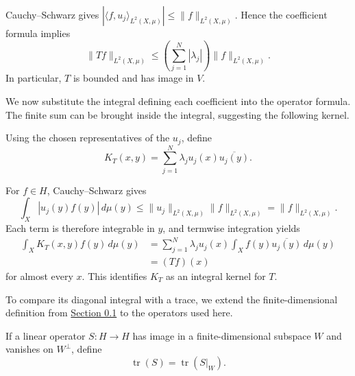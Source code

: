 Cauchy--Schwarz gives $|\langle f,u_j\rangle_{L^2(X,\mu)}|\leq\|f\|_{L^2(X,\mu)}$. Hence the coefficient formula implies
\[
\|Tf\|_{L^2(X,\mu)}
\leq\left(\sum_{j=1}^N|\lambda_j|\right)\|f\|_{L^2(X,\mu)}.
\]
In particular, $T$ is bounded and has image in $V$.

We now substitute the integral defining each coefficient into the operator formula. The finite sum can be brought inside the integral, suggesting the following kernel.

\begin{definition}\label{finite-spectral-kernel}
Using the chosen representatives of the $u_j$, define
\[
K_T(x,y)=\sum_{j=1}^N\lambda_j u_j(x)\overline{u_j(y)}.
\]
\end{definition}

For $f\in H$, Cauchy--Schwarz gives
\[
\int_X|u_j(y)f(y)|\,d\mu(y)
\leq\|u_j\|_{L^2(X,\mu)}\|f\|_{L^2(X,\mu)}
=\|f\|_{L^2(X,\mu)}.
\]
Each term is therefore integrable in $y$, and termwise integration yields
\[
\begin{aligned}
\int_XK_T(x,y)f(y)\,d\mu(y)
&=\sum_{j=1}^N\lambda_j u_j(x)
 \int_X f(y)\overline{u_j(y)}\,d\mu(y)\\
&=(Tf)(x)
\end{aligned}
\]
for almost every $x$. This identifies $K_T$ as an integral kernel for $T$.

To compare its diagonal integral with a trace, we extend the finite-dimensional definition from \hyperref[v1a-ch00-s1]{Section 0.1} to the operators used here.

\begin{definition}\label{finite-kernel-trace-definition}
If a linear operator $S:H\to H$ has image in a finite-dimensional subspace $W$ and vanishes on $W^\perp$, define
\[
\operatorname{tr}(S)=\operatorname{tr}(S|_W).
\]
\end{definition}

